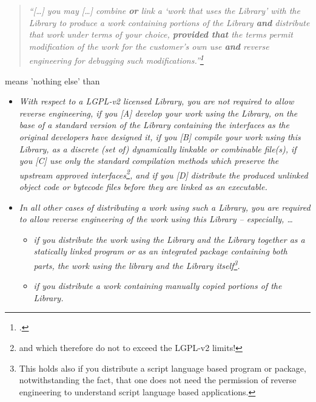 \begin{quote}\noindent\emph{\enquote{[\ldots] you may [\ldots] combine
\textbf{or} link a \enquote{work that uses the Library} with the Library to
produce a work containing portions of the Library \textbf{and} distribute that
work under terms of your choice, \textbf{provided that} the terms permit
modification of the work for the customer's own use \textbf{and} \emph{reverse
engineering} for debugging such modifications.}\footcite[cf.][\nopage wp., §6, 
emphasis KR.]{Lgpl21OsiLicense1999a}}
\end{quote}

means 'nothing else' than

\begin{itemize}
  \item \emph{With respect to a LGPL-v2 licensed Library, you are not required
  to allow reverse engineering, if you [A] develop your work using the Library,
  on the base of a standard version of the Library containing the interfaces as
  the original developers have designed it, if you [B] compile your work using
  this Library, as a discrete (set of) dynamically linkable or combinable
  file(s), if you [C] use only the standard compilation methods which preserve
  the upstream approved interfaces\footnote{and which therefore do not to exceed
  the LGPL-v2 limits!}, and if you [D] distribute the produced unlinked object
  code or bytecode files before they are linked as an executable.}
  \item \emph{In all other cases of distributing a work using such a Library,
  you are required to allow reverse engineering of the work using this Library
  -- especially, \ldots}
  \begin{itemize}
    \item \emph{if you distribute the work using the Library and the Library
    together as a statically linked program or as an integrated package
    containing both parts, the work using the library and the Library
    itself\footnote{This holds also if you distribute a script language based
    program or package, notwithstanding the fact, that one does not need the
    permission of reverse engineering to understand script language based
    applications.}.}
    \item \emph{if you distribute a work containing manually copied portions of
    the Library.}
  \end{itemize}
\end{itemize}


